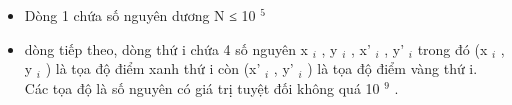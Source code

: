 \begin{itemize}
	\item     Dòng 1 chứa số nguyên dương N ≤ 10    $^     5    $
	\item     dòng tiếp theo, dòng thứ i chứa 4 số nguyên x    $_     i    $    , y    $_     i    $    , x'    $_     i    $    , y'    $_     i    $    trong đó (x    $_     i    $    , y    $_     i    $    ) là tọa độ điểm xanh thứ i còn (x'    $_     i    $    , y'    $_     i    $    ) là tọa độ điểm vàng thứ i. Các tọa độ là số nguyên có giá trị tuyệt đối không quá 10    $^     9    $    .   
\end{itemize}
